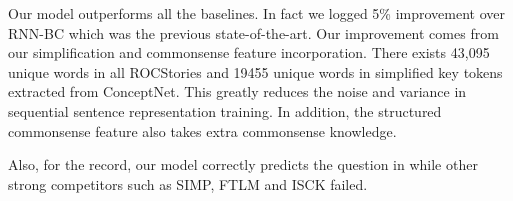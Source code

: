  
Our model outperforms all the baselines. In fact we 
logged 5\% improvement over
RNN-BC which was the previous state-of-the-art. 
Our improvement comes from our simplification and commonsense feature 
incorporation. There exists 43,095 unique words in all ROCStories and 
19455 unique words in simplified key tokens extracted from ConceptNet. 
This greatly reduces the noise and variance in sequential sentence 
representation training. In addition, the structured commonsense feature 
also takes extra commonsense knowledge.

Also, for the record, our model correctly predicts the question in
 while other strong competitors such as SIMP, FTLM and ISCK
failed.

